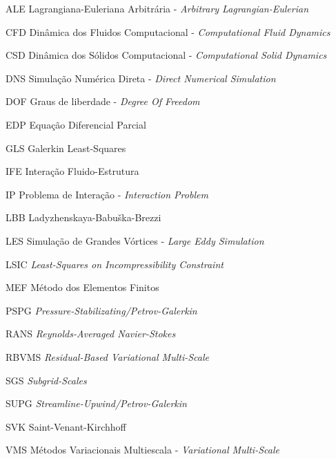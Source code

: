 \begin{siglas}
	\item[ALE] Lagrangiana-Euleriana Arbitrária - \textit{Arbitrary Lagrangian-Eulerian}
	\item[CFD] Dinâmica dos Fluidos Computacional - \textit{Computational Fluid Dynamics}
	\item[CSD] Dinâmica dos Sólidos Computacional - \textit{Computational Solid Dynamics}
	\item[DNS] Simulação Numérica Direta - \textit{Direct Numerical Simulation}
	\item[DOF] Graus de liberdade - \textit{Degree Of Freedom}
	\item[EDP] Equação Diferencial Parcial
	\item[GLS] Galerkin Least-Squares
	\item[IFE] Interação Fluido-Estrutura
	\item[IP] Problema de Interação - \textit{Interaction Problem}
	\item[LBB] Ladyzhenskaya-Babuška-Brezzi
	\item[LES] Simulação de Grandes Vórtices - \textit{Large Eddy Simulation}
	\item[LSIC] \textit{Least-Squares on Incompressibility Constraint}
	\item[MEF] Método dos Elementos Finitos
	\item[PSPG] \textit{Pressure-Stabilizating/Petrov-Galerkin}
	\item[RANS] \textit{Reynolds-Averaged Navier-Stokes}
	\item[RBVMS] \textit{Residual-Based Variational Multi-Scale}
	\item[SGS] \textit{Subgrid-Scales}
	\item[SUPG] \textit{Streamline-Upwind/Petrov-Galerkin}
	\item[SVK] Saint-Venant-Kirchhoff
	\item[VMS] Métodos Variacionais Multiescala - \textit{Variational Multi-Scale}
\end{siglas}
